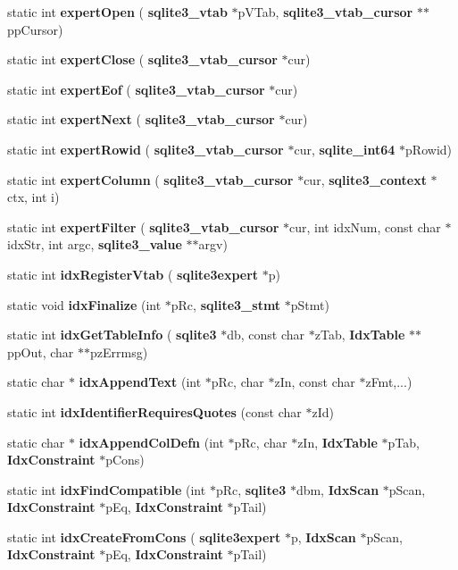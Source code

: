 \begin{DoxyCompactItemize}
\item 
static int \textbf{ expert\+Open} (\textbf{ sqlite3\+\_\+vtab} $\ast$p\+V\+Tab, \textbf{ sqlite3\+\_\+vtab\+\_\+cursor} $\ast$$\ast$pp\+Cursor)
\item 
static int \textbf{ expert\+Close} (\textbf{ sqlite3\+\_\+vtab\+\_\+cursor} $\ast$cur)
\item 
static int \textbf{ expert\+Eof} (\textbf{ sqlite3\+\_\+vtab\+\_\+cursor} $\ast$cur)
\item 
static int \textbf{ expert\+Next} (\textbf{ sqlite3\+\_\+vtab\+\_\+cursor} $\ast$cur)
\item 
static int \textbf{ expert\+Rowid} (\textbf{ sqlite3\+\_\+vtab\+\_\+cursor} $\ast$cur, \textbf{ sqlite\+\_\+int64} $\ast$p\+Rowid)
\item 
static int \textbf{ expert\+Column} (\textbf{ sqlite3\+\_\+vtab\+\_\+cursor} $\ast$cur, \textbf{ sqlite3\+\_\+context} $\ast$ctx, int i)
\item 
static int \textbf{ expert\+Filter} (\textbf{ sqlite3\+\_\+vtab\+\_\+cursor} $\ast$cur, int idx\+Num, const char $\ast$idx\+Str, int argc, \textbf{ sqlite3\+\_\+value} $\ast$$\ast$argv)
\item 
static int \textbf{ idx\+Register\+Vtab} (\textbf{ sqlite3expert} $\ast$p)
\item 
static void \textbf{ idx\+Finalize} (int $\ast$p\+Rc, \textbf{ sqlite3\+\_\+stmt} $\ast$p\+Stmt)
\item 
static int \textbf{ idx\+Get\+Table\+Info} (\textbf{ sqlite3} $\ast$db, const char $\ast$z\+Tab, \textbf{ Idx\+Table} $\ast$$\ast$pp\+Out, char $\ast$$\ast$pz\+Errmsg)
\item 
static char $\ast$ \textbf{ idx\+Append\+Text} (int $\ast$p\+Rc, char $\ast$z\+In, const char $\ast$z\+Fmt,...)
\item 
static int \textbf{ idx\+Identifier\+Requires\+Quotes} (const char $\ast$z\+Id)
\item 
static char $\ast$ \textbf{ idx\+Append\+Col\+Defn} (int $\ast$p\+Rc, char $\ast$z\+In, \textbf{ Idx\+Table} $\ast$p\+Tab, \textbf{ Idx\+Constraint} $\ast$p\+Cons)
\item 
static int \textbf{ idx\+Find\+Compatible} (int $\ast$p\+Rc, \textbf{ sqlite3} $\ast$dbm, \textbf{ Idx\+Scan} $\ast$p\+Scan, \textbf{ Idx\+Constraint} $\ast$p\+Eq, \textbf{ Idx\+Constraint} $\ast$p\+Tail)
\item 
static int \textbf{ idx\+Create\+From\+Cons} (\textbf{ sqlite3expert} $\ast$p, \textbf{ Idx\+Scan} $\ast$p\+Scan, \textbf{ Idx\+Constraint} $\ast$p\+Eq, \textbf{ Idx\+Constraint} $\ast$p\+Tail)

\end{DoxyCompactItemize}
